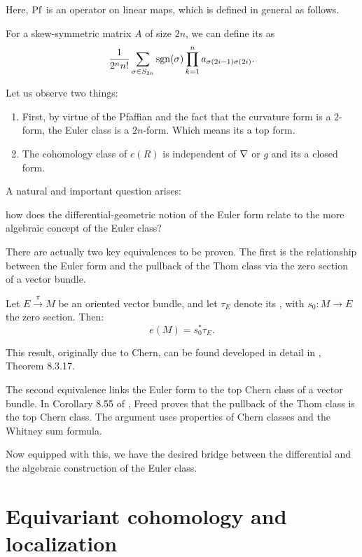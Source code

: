 \documentclass[12pt]{memoir}
\begin{document}
Here, $\operatorname{Pf}$ is an operator on linear maps, which is defined in general as follows.

\begin{Def}
    For a skew-symmetric matrix $A$ of size $2n$, we can define its  as 
    $$\frac{1}{2^nn!}\sum_{\sigma\in S_{2n}}\operatorname{sgn}(\sigma)\prod_{k=1}^{n}a_{\sigma(2i-1)\sigma(2i)}.$$
\end{Def}

\begin{Rmk}
    Let us observe two things:
    \begin{enumerate}
        \item First, by virtue of the Pfaffian and the fact that the curvature form is a $2$-form, the Euler class is a $2n$-form. Which means its a top form.
        \item The cohomology class of $e(R)$ is independent of ${\mathbf{\nabla}}$ or $g$ and its a closed form.
    \end{enumerate}
\end{Rmk}

A natural and important question arises: 
\begin{significant}
    how does the differential-geometric notion of the Euler form relate to the more algebraic concept of the Euler class?
\end{significant}
There are actually two key equivalences to be proven. The first is the relationship between the Euler form and the pullback of the Thom class via the zero section of a vector bundle.

\begin{Prop}
    Let $E \xrightarrow{\pi} M$ be an oriented vector bundle, and let $\tau_E$ denote its , with $s_0 \colon M \to E$ the zero section. Then:
$$e(M)=s_0^\ast\tau_E.$$
\end{Prop}

This result, originally due to Chern, can be found developed in detail in \cite{NicolaescuNotes}, Theorem 8.3.17.\par
The second equivalence links the Euler form to the top Chern class of a vector bundle. In Corollary 8.55 of \cite{FreedNotes}, Freed proves that the pullback of the Thom class is the top Chern class. The argument uses properties of Chern classes and the Whitney sum formula.\par
Now equipped with this, we have the desired bridge between the differential and the algebraic construction of the Euler class.
\section{Equivariant cohomology and localization}
\end{document}
